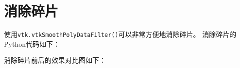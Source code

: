 \documentclass{article}
\begin{document}
\section{消除碎片}
使用\texttt{vtk.vtkSmoothPolyDataFilter()}可以非常方便地消除碎片。
消除碎片的Python代码如下：
 

消除碎片前后的效果对比图如下：
\begin{figure}[H]
    \centering
    \,    
    

\end{figure}
\end{document}
